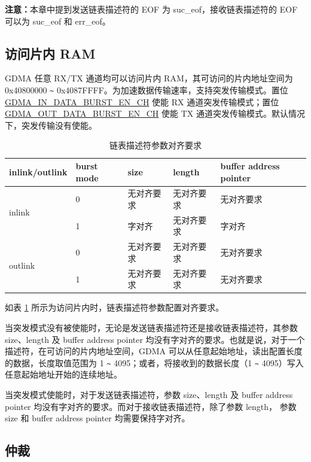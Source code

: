 \documentclass[main\_\_CN.tex]{subfiles}
\begin{document}
{\bfseries 注意：}本章中提到发送链表描述符的 EOF 为 suc\_eof，接收链表描述符的 EOF 可以为 suc\_eof 和 err\_eof。

\subsection{访问片内 RAM}\label{sec:dma-access-inter-ram}
GDMA 任意 RX/TX 通道均可以访问片内 RAM，其可访问的片内地址空间为0x40800000 \verb+~+ 0x4087FFFF。为加速数据传输速率，支持突发传输模式。置位 \hyperref[fielddesc:GDMAINDATABURSTENCHN]{GDMA\_IN\_DATA\_BURST\_EN\_CH} 使能 RX 通道突发传输模式；置位 \hyperref[fielddesc:GDMAOUTDATABURSTENCHN]{GDMA\_OUT\_DATA\_BURST\_EN\_CH} 使能 TX 通道突发传输模式。默认情况下，突发传输没有使能。

\begin{longtable}[c]{ | l | l | l | l | l | }
    \caption{链表描述符参数对齐要求}
    \label{tab:gdma-inter-desc-param-align}
    \\\hline
    \rowcolor{lightgray}
    \textbf{inlink/outlink} & \textbf{burst mode} & \textbf{size} & \textbf{length} & \textbf{buffer address pointer} \\\hline

    \multirow{2}{*}{inlink}  & 0  & 无对齐要求 & 无对齐要求  & 无对齐要求 \\\cline{2-5}
     & 1 & 字对齐   & 无对齐要求  & 字对齐 \\\hline
    \multirow{2}{*}{outlink} & 0  & 无对齐要求 & 无对齐要求  & 无对齐要求 \\\cline{2-5}
     & 1 & 无对齐要求 & 无对齐要求  & 无对齐要求 \\\hline
\end{longtable}


如表 \ref{tab:gdma-inter-desc-param-align} 所示为访问片内时，链表描述符参数配置对齐要求。

当突发模式没有被使能时，无论是发送链表描述符还是接收链表描述符，其参数 size、length 及 buffer address pointer 均没有字对齐的要求。也就是说，对于一个描述符，在可访问的片内地址空间，GDMA 可以从任意起始地址，读出配置长度的数据，长度取值范围为 1 \verb+~+ 4095；或者，将接收到的数据长度（1 \verb+~+ 4095）写入任意起始地址开始的连续地址。

当突发模式使能时，对于发送链表描述符，参数 size、length 及 buffer address pointer 均没有字对齐的要求。而对于接收链表描述符，除了参数 length， 参数 size 和 buffer address pointer 均需要保持字对齐。


\subsection{仲裁}
\end{document}
